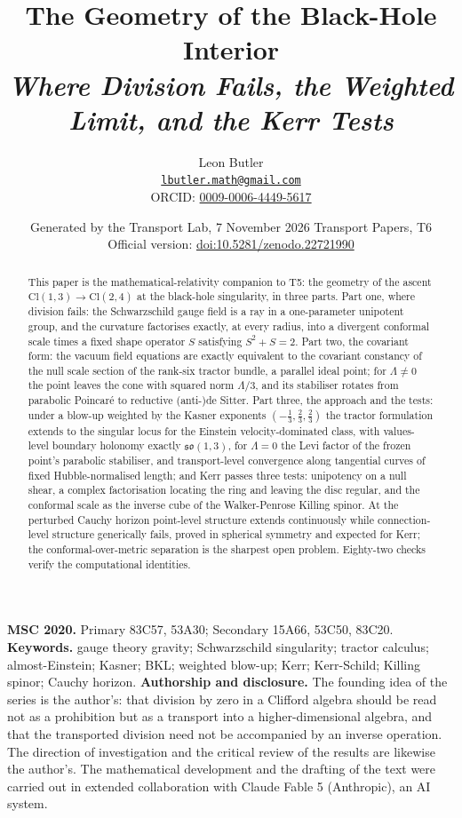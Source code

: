 \documentclass[11pt]{article}
\title{\bfseries The Geometry of the Black-Hole Interior\\[4pt]\large\itshape Where Division Fails, the Weighted Limit, and the Kerr Tests}
\author{Leon Butler\\ \normalsize\href{mailto:lbutler.math@gmail.com}{\texttt{lbutler.math@gmail.com}}\\ \normalsize ORCID: \href{https://orcid.org/0009-0006-4449-5617}{0009-0006-4449-5617}}
\date{Generated by the Transport Lab, 7 November 2026 \textperiodcentered{} Transport Papers, T6\\[3pt]\small Official version: \href{https://doi.org/10.5281/zenodo.22721990}{doi:10.5281/zenodo.22721990}}
\theoremstyle{definition}
\theoremstyle{plain}
\providecommand{\Cl}{}\renewcommand{\Cl}{\mathrm{Cl}}
\begin{document}
\maketitle
\begin{abstract}
\normalsize
This paper is the mathematical-relativity companion to T5: the geometry of the ascent $\Cl(1,3) \to \Cl(2,4)$ at the black-hole singularity, in three parts. Part one, where division fails: the Schwarzschild gauge field is a ray in a one-parameter unipotent group, and the curvature factorises exactly, at every radius, into a divergent conformal scale times a fixed shape operator $S$ satisfying $S^2 + S = 2$. Part two, the covariant form: the vacuum field equations are exactly equivalent to the covariant constancy of the null scale section of the rank-six tractor bundle, a parallel ideal point; for $\Lambda \neq 0$ the point leaves the cone with squared norm $\Lambda/3$, and its stabiliser rotates from parabolic Poincar\'e to reductive (anti-)de Sitter. Part three, the approach and the tests: under a blow-up weighted by the Kasner exponents $(-\tfrac13, \tfrac23, \tfrac23)$ the tractor formulation extends to the singular locus for the Einstein velocity-dominated class, with values-level boundary holonomy exactly $\mathfrak{so}(1,3)$, for $\Lambda = 0$ the Levi factor of the frozen point's parabolic stabiliser, and transport-level convergence along tangential curves of fixed Hubble-normalised length; and Kerr passes three tests: unipotency on a null shear, a complex factorisation locating the ring and leaving the disc regular, and the conformal scale as the inverse cube of the Walker-Penrose Killing spinor. At the perturbed Cauchy horizon point-level structure extends continuously while connection-level structure generically fails, proved in spherical symmetry and expected for Kerr; the conformal-over-metric separation is the sharpest open problem. Eighty-two checks verify the computational identities.
\end{abstract}
\medskip
\noindent\textbf{MSC 2020.} Primary 83C57, 53A30; Secondary 15A66, 53C50, 83C20.\\
\textbf{Keywords.} gauge theory gravity; Schwarzschild singularity; tractor calculus; almost-Einstein; Kasner; BKL; weighted blow-up; Kerr; Kerr-Schild; Killing spinor; Cauchy horizon.
\newpage
\noindent \textbf{Authorship and disclosure. }The founding idea of the series is the author's: that division by zero in a Clifford algebra should be read not as a prohibition but as a transport into a higher-dimensional algebra, and that the transported division need not be accompanied by an inverse operation. The direction of investigation and the critical review of the results are likewise the author's. The mathematical development and the drafting of the text were carried out in extended collaboration with Claude Fable 5 (Anthropic), an AI system.
\end{document}
